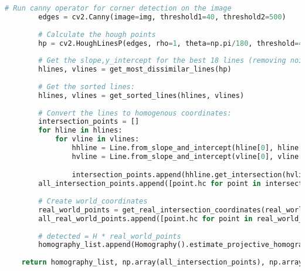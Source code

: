 \documentclass{article}
\begin{document}
\begin{lstlisting}[language=Python]
        # Run canny operator for corner detection on the image
        edges = cv2.Canny(image=img, threshold1=40, threshold2=500)
        
        # Calculate the hough points
        hp = cv2.HoughLinesP(edges, rho=1, theta=np.pi/180, threshold=40, minLineLength=50, maxLineGap=100).squeeze()
        
        # Get the slope,y_intercept for the best 18 lines (removing noise)
        hlines, vlines = get_most_dissimilar_lines(hp)
        
        # Get the sorted lines:
        hlines, vlines = get_sorted_lines(hlines, vlines)
        
        # Convert the lines to homogenous coordinates:
        intersection_points = []
        for hline in hlines:
            for vline in vlines:
                hhline = Line.from_slope_and_intercept(hline[0], hline[1])
                hvline = Line.from_slope_and_intercept(vline[0], vline[1])

                intersection_points.append(hhline.get_intersection(hvline))
        all_intersection_points.append([point.hc for point in intersection_points])
        
        # Create world_coordinates
        real_world_points = get_real_intersection_coordinates(real_world_scaling=real_world_scaling)
        all_real_world_points.append([point.hc for point in real_world_points])
        
        # detected = H * real_world_points
        homography_list.append(Homography().estimate_projective_homography(x_points=real_world_points, x_prime_points=intersection_points))
        
    return homography_list, np.array(all_intersection_points), np.array(all_real_world_points)
\end{lstlisting}
\end{document}
